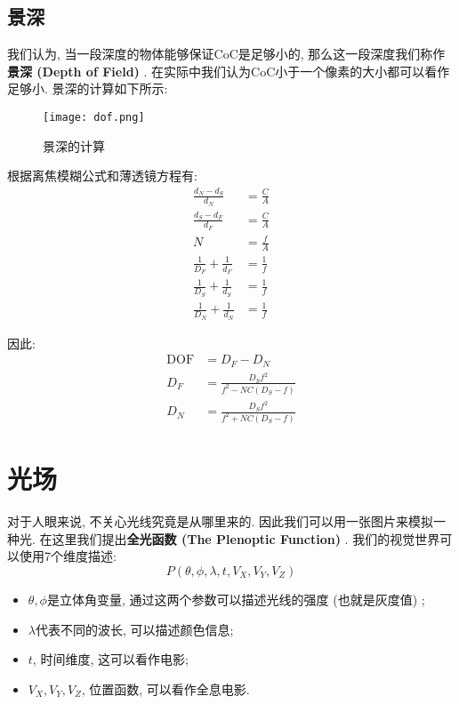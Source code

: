 \documentclass[openany]{progbookcn}
\begin{document}
\subsection{景深}

	我们认为, 当一段深度的物体能够保证CoC是足够小的, 那么这一段深度我们称作\textbf{景深 (Depth of Field) }. 在实际中我们认为CoC小于一个像素的大小都可以看作足够小. 景深的计算如下所示: 
	
		\begin{figure}[H]
		\centering
		\texttt{[image: dof.png]}
		\caption{景深的计算}
		\label{fig:dof}
	\end{figure}

根据离焦模糊公式和薄透镜方程有: 
\begin{equation}
	\begin{split}
		\frac{d_{N}-d_{S}}{d_{N}} &=\frac{C}{A} \\
		\frac{d_{S}-d_{F}}{d_{F}} &=\frac{C}{A} \\
		N &=\frac{f}{A} \\
		\frac{1}{D_{F}}+\frac{1}{d_{F}} &=\frac{1}{f} \\
		\frac{1}{D_{S}}+\frac{1}{d_{S}} &=\frac{1}{f} \\
		\frac{1}{D_{N}}+\frac{1}{d_{N}} &=\frac{1}{f}
	\end{split}
\end{equation}

因此: 
\begin{equation}
	\begin{split}
		\mathrm{DOF}&=D_{F}-D_{N} \\
		D_{F}&=\frac{D_{S} f^{2}}{f^{2}-N C\left(D_{S}-f\right)}\\
		D_{N}&=\frac{D_{S} f^{2}}{f^{2}+N C\left(D_{S}-f\right)}
	\end{split}
\end{equation}

\section{光场}

对于人眼来说, 不关心光线究竟是从哪里来的. 因此我们可以用一张图片来模拟一种光. 在这里我们提出\textbf{全光函数 (The Plenoptic Function) }. 我们的视觉世界可以使用7个维度描述: 
\begin{equation}
	P(\theta,\phi,\lambda,t,V_X,V_Y,V_Z)
\end{equation}

\begin{itemize}
	\item $\theta,\phi$是立体角变量, 通过这两个参数可以描述光线的强度 (也就是灰度值) ; 
	\item $\lambda$代表不同的波长, 可以描述颜色信息; 
	\item $t$, 时间维度, 这可以看作电影; 
	\item $V_X,V_Y,V_Z$, 位置函数, 可以看作全息电影. 
\end{itemize}
\end{document}
